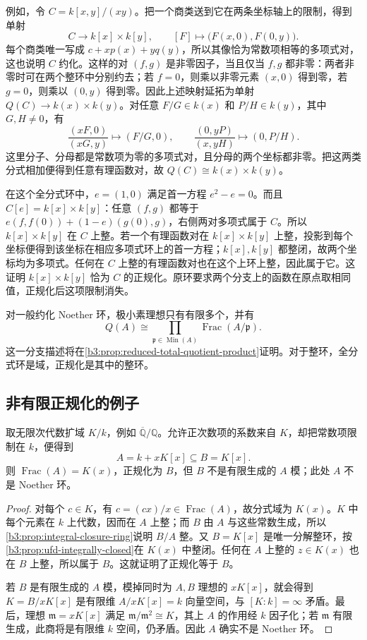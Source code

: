 \ProseParagraphBreak
例如，令 \(C=k[x,y]/(xy)\)。把一个商类送到它在两条坐标轴上的限制，得到单射
\[
	C\longrightarrow k[x]\times k[y],\qquad [F]\longmapsto\bigl(F(x,0),F(0,y)\bigr).
\]
每个商类唯一写成 \(c+xp(x)+yq(y)\)，所以其像恰为常数项相等的多项式对，这也说明 \(C\) 约化。这样的对 \((f,g)\) 是非零因子，当且仅当 \(f,g\) 都非零：两者非零时可在两个整环中分别约去；若 \(f=0\)，则乘以非零元素 \((x,0)\) 得到零，若 \(g=0\)，则乘以 \((0,y)\) 得到零。因此上述映射延拓为单射 \(Q(C)\to k(x)\times k(y)\)。对任意 \(F/G\in k(x)\) 和 \(P/H\in k(y)\)，其中 \(G,H\ne0\)，有
\[
	\frac{(xF,0)}{(xG,y)}\longmapsto(F/G,0),\qquad \frac{(0,yP)}{(x,yH)}\longmapsto(0,P/H).
\]
这里分子、分母都是常数项为零的多项式对，且分母的两个坐标都非零。把这两类分式相加便得到任意有理函数对，故 \(Q(C)\cong k(x)\times k(y)\)。

在这个全分式环中，\(e=(1,0)\) 满足首一方程 \(e^2-e=0\)。而且 \(C[e]=k[x]\times k[y]\)：任意 \((f,g)\) 都等于 \(e(f,f(0))+(1-e)(g(0),g)\)，右侧两对多项式属于 \(C\)。所以 \(k[x]\times k[y]\) 在 \(C\) 上整。若一个有理函数对在 \(k[x]\times k[y]\) 上整，投影到每个坐标便得到该坐标在相应多项式环上的首一方程；\(k[x],k[y]\) 都整闭，故两个坐标均为多项式。任何在 \(C\) 上整的有理函数对也在这个上环上整，因此属于它。这证明 \(k[x]\times k[y]\) 恰为 \(C\) 的正规化。原环要求两个分支上的函数在原点取相同值，正规化后这项限制消失。

对一般约化 Noether 环，极小素理想只有有限多个，并有
\[
	Q(A)\cong\prod_{\mathfrak p\in\operatorname{Min}(A)} \operatorname{Frac}(A/\mathfrak p).
\]
这一分支描述将在\cref{b3:prop:reduced-total-quotient-product}证明。对于整环，全分式环是域，正规化是其中的整环。

\subsection{非有限正规化的例子}\label{b3:subsec:0604:02}

\begin{example}\label{b3:exm:nonfinite-normalization}
	取无限次代数扩域 \(K/k\)，例如 \(\overline{\mathbb Q}/\mathbb Q\)。允许正次数项的系数来自 \(K\)，却把常数项限制在 \(k\)，便得到
	\[
		A=k+xK[x]\subseteq B=K[x].
	\]
	则 \(\operatorname{Frac}(A)=K(x)\)，正规化为 \(B\)，但 \(B\) 不是有限生成的 \(A\) 模；此处 \(A\) 不是 Noether 环。
\end{example}
\begin{proof}
	对每个 \(c\in K\)，有 \(c=(cx)/x\in\operatorname{Frac}(A)\)，故分式域为 \(K(x)\)。\(K\) 中每个元素在 \(k\) 上代数，因而在 \(A\) 上整；而 \(B\) 由 \(A\) 与这些常数生成，所以\cref{b3:prop:integral-closure-ring}说明 \(B/A\) 整。又 \(B=K[x]\) 是唯一分解整环，按\cref{b3:prop:ufd-integrally-closed}在 \(K(x)\) 中整闭。任何在 \(A\) 上整的 \(z\in K(x)\) 也在 \(B\) 上整，所以属于 \(B\)。这就证明了正规化等于 \(B\)。

	若 \(B\) 是有限生成的 \(A\) 模，模掉同时为 \(A,B\) 理想的 \(xK[x]\)，就会得到 \(K=B/xK[x]\) 是有限维 \(A/xK[x]=k\) 向量空间，与 \([K:k]=\infty\) 矛盾。最后，理想 \(\mathfrak m=xK[x]\) 满足 \(\mathfrak m/\mathfrak m^2\cong K\)，其上 \(A\) 的作用经 \(k\) 因子化；若 \(\mathfrak m\) 有限生成，此商将是有限维 \(k\) 空间，仍矛盾。因此 \(A\) 确实不是 Noether 环。
\end{proof}

